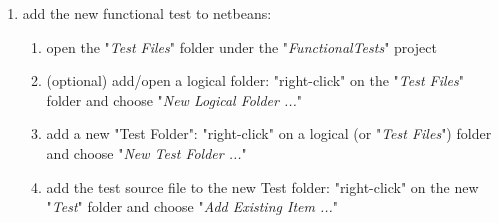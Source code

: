\begin{enumerate}
\begin{description}
	\end{description}
\item add the new functional test to netbeans:
		\begin{enumerate}
	  \item open the "\textit{Test Files}" folder under the "\textit{FunctionalTests}" project
	\item (optional) add/open a logical folder:
		"right-click" on the "\textit{Test Files}" folder and choose "\textit{New Logical Folder ...}"
	\item add a new "Test Folder":
		"right-click" on a logical (or "\textit{Test Files}") folder and choose "\textit{New Test Folder ...}"
	\item add the test source file to the new Test folder:
		"right-click" on the new "\textit{Test}" folder and choose "\textit{Add Existing Item ...}"
	  \end{enumerate}	  
\end{enumerate}
